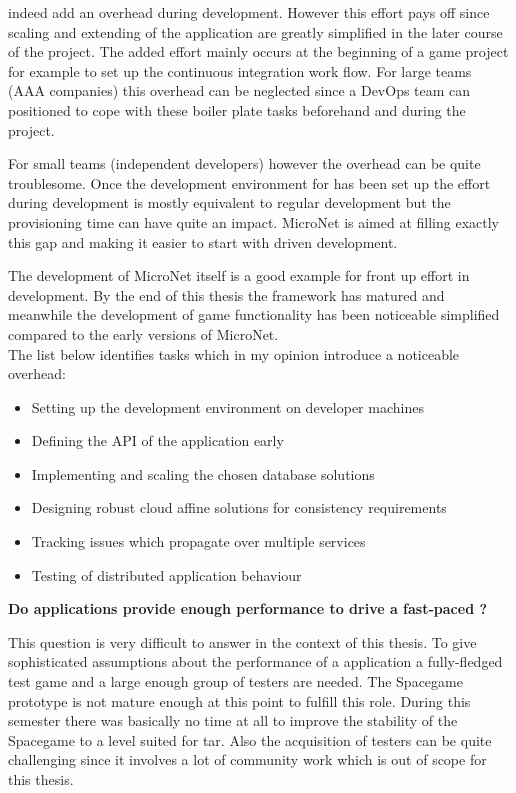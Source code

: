 \mss{} indeed  add an overhead during development. However this effort pays off
since scaling and extending of the application are greatly simplified in the
later course of the project. The added effort mainly occurs at the beginning of
a game project for example to set up the continuous integration work flow. For
large teams (AAA companies) this overhead can be neglected since a DevOps team
can positioned to cope with these boiler plate tasks beforehand and during the
project.

For small teams (independent developers) however the overhead can be quite
troublesome. Once the development environment for \ms{} has been set up the
effort during development is mostly equivalent to regular \og{} development but
the provisioning time can have quite an impact. MicroNet is aimed at filling
exactly this gap and making it easier to start with \ms{} driven \og{}
development.

The development of MicroNet itself is a good example for front up effort in
\ms{} development. By the end of this thesis the framework has matured and
meanwhile the development of game functionality has been noticeable simplified
compared to the early versions of MicroNet.\\

The list below identifies tasks which in my opinion introduce a noticeable
overhead:
\begin{itemize}
  \item Setting up the development environment on developer machines
  \item Defining the API of the application early
  \item Implementing and scaling the chosen database solutions
  \item Designing robust cloud affine solutions for consistency requirements
  \item Tracking issues which propagate over multiple services
  \item Testing of distributed application behaviour
\end{itemize}

\noindent \textbf{Do \ms{} applications provide enough performance to
drive a fast-paced \og{}?}

This question is very difficult to answer in the context of this thesis. To give
sophisticated assumptions about the performance of a \ms{} application a
fully-fledged test game and a large enough group of testers are needed. The
Spacegame prototype is not mature enough at this point to fulfill this role.
During this semester there was basically no time at all to improve the stability
of the Spacegame to a level suited for \gls{tar}. Also the acquisition of
testers can be quite challenging since it involves a lot of community work which
is out of scope for this thesis.

